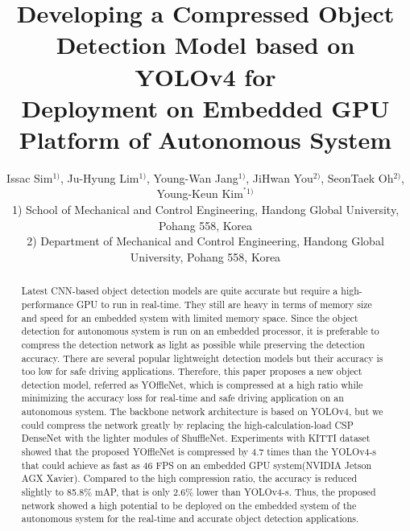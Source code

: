 \documentclass[10pt,twocolumn,letterpaper]{article}
\begin{document}
\title{\vspace{-1cm}Developing a Compressed Object Detection Model based on YOLOv4 for\\
 Deployment on Embedded GPU Platform of Autonomous System \vspace{-.25cm}}

\author{Issac Sim$^{1)}$, Ju-Hyung Lim$^{1)}$, Young-Wan Jang$^{1)}$, JiHwan You$^{2)}$, SeonTaek Oh$^{2)}$, Young-Keun Kim$^{^{*}1)}$\\
\small{1) School of Mechanical and Control Engineering, Handong Global University, Pohang 558, Korea}\\ 
\small{2) Department of Mechanical and Control Engineering, Handong Global University, Pohang 558, Korea}
}

\maketitle

\begin{abstract}
\vspace{-.25cm}
Latest CNN-based object detection models are quite accurate but require a high-performance GPU to run in real-time. They still are heavy in terms of memory size and speed for an embedded system with limited memory space. Since the object detection for autonomous system is run on an embedded processor, it is preferable to compress the detection network as light as possible while preserving the detection accuracy. There are several popular lightweight detection models but their accuracy is too low for safe driving applications.  Therefore, this paper proposes a new object detection model, referred as YOffleNet, which is compressed at a high ratio while minimizing the accuracy loss for real-time and safe driving application on an autonomous system. The backbone network architecture is based on YOLOv4, but we could compress the network greatly by replacing the high-calculation-load CSP DenseNet with the lighter modules of ShuffleNet. Experiments with KITTI dataset showed that the proposed YOffleNet is compressed by 4.7 times than the YOLOv4-s that could achieve as fast as 46 FPS on an embedded GPU system(NVIDIA Jetson AGX Xavier). Compared to the high compression ratio, the accuracy is reduced slightly to 85.8\% mAP, that is only 2.6\% lower than YOLOv4-s. Thus, the proposed network showed a high potential to be deployed on the embedded system of the autonomous system for the real-time and accurate object detection applications. 
\end{abstract}
\end{document}
